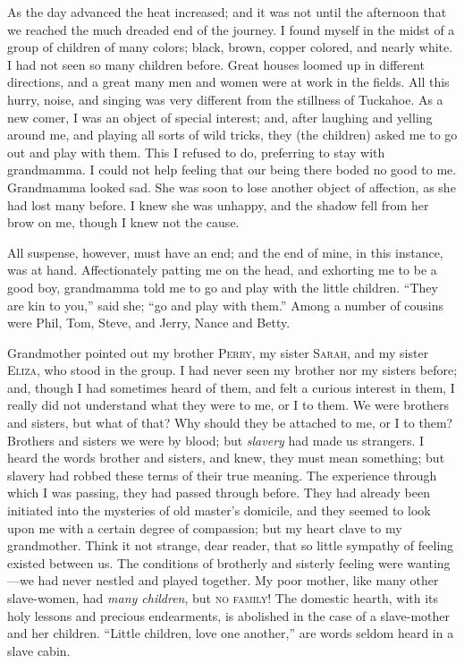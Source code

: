 As the day advanced the heat increased; and it was not until the
afternoon that we reached the much dreaded end of the journey. I found
myself in the midst of a group of children of many colors; black, brown,
copper colored, and nearly white. I had not seen so many children
before. Great houses loomed up in different directions, and a great many
men and women were at work in the fields. All this hurry, noise, and
singing was very different from the stillness of Tuckahoe. As a new
comer, I was an object of special interest; and, after laughing and
yelling around me, and playing all sorts of wild tricks, they (the
children) asked me to go out and play with them. This I refused to do,
preferring to stay with grandmamma. I could not help feeling that our
being there boded no good to me. Grandmamma looked sad. She was soon to
lose another object of affection, as she had lost many before. I knew
she was unhappy, and the shadow fell from her brow on me, though I knew
not the cause.

All suspense, however, must have an end; and the end of mine, in this
instance, was at hand. Affectionately patting me on the head, and
exhorting me to be a good boy, grandmamma told me to go and play with
the little children. ``They are kin to you,''
{\protect\hypertarget{48}{}{}}said she; ``go and play with them.'' Among
a number of cousins were Phil, Tom, Steve, and Jerry, Nance and Betty.

Grandmother pointed out my brother \textsc{Perry}, my sister
\textsc{Sarah}, and my sister \textsc{Eliza}, who stood in the group. I
had never seen my brother nor my sisters before; and, though I had
sometimes heard of them, and felt a curious interest in them, I really
did not understand what they were to me, or I to them. We were brothers
and sisters, but what of that? Why should they be attached to me, or I
to them? Brothers and sisters we were by blood; but \emph{slavery} had
made us strangers. I heard the words brother and sisters, and knew, they
must mean something; but slavery had robbed these terms of their true
meaning. The experience through which I was passing, they had passed
through before. They had already been initiated into the mysteries of
old master's domicile, and they seemed to look upon me with a certain
degree of compassion; but my heart clave to my grandmother. Think it not
strange, dear reader, that so little sympathy of feeling existed between
us. The conditions of brotherly and sisterly feeling were wanting---we
had never nestled and played together. My poor mother, like many other
slave-women, had \emph{many children}, but \textsc{no family}! The
domestic hearth, with its holy lessons and precious endearments, is
abolished in the case of a slave-mother and her children. ``Little
children, love one another,'' are words seldom heard in a slave cabin.

